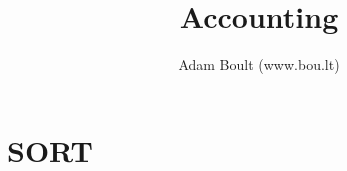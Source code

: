 \documentclass[oneside]{book}
\begin{document}
\author{Adam Boult (www.bou.lt)}
\title{Accounting}
\maketitle

\setcounter{tocdepth}{0}
\tableofcontents



\part{SORT}

\end{document}
